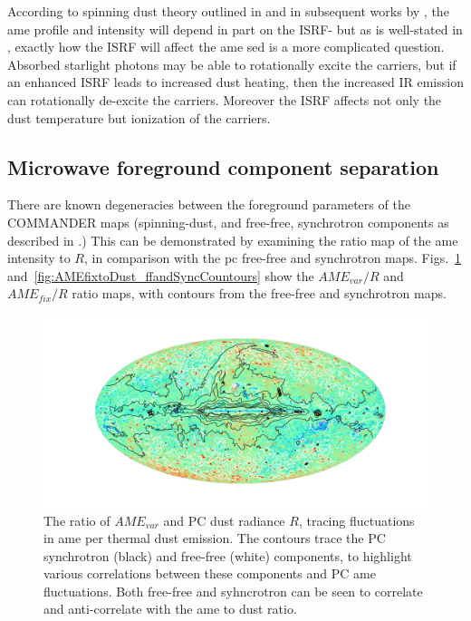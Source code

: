             According to spinning dust theory outlined in \cite{draine98a} and in subsequent works by \cite{ysard10a}, the \acrshort{ame} profile and intensity will depend in part on the ISRF- but as is well-stated in \cite{hensley17a}, exactly how the ISRF will affect the \acrshort{ame} \acrshort{sed} is a more complicated question. Absorbed starlight photons may be able to rotationally excite the carriers, but if an enhanced ISRF leads to increased dust heating, then the increased IR emission can rotationally de-excite the carriers. Moreover the ISRF affects not only the dust temperature but ionization of the carriers.

          \subsection{Microwave foreground component separation}
            There are known degeneracies between the foreground parameters of the COMMANDER maps (spinning-dust, and free-free, synchrotron components as described in \cite{planck15X}.) This can be demonstrated by examining the ratio map of the \acrshort{ame} intensity to $R$, in comparison with the \acrshort{pc} free-free and synchrotron maps. Figs.~\ref{fig:AMEvartoDust_ffandSyncCountours} and~\ref{fig:AMEfixtoDust_ffandSyncCountours} show the $AME_{var}/R$ and $AME_{fix}/R$ ratio maps, with contours from the free-free and synchrotron maps.
                \begin{figure}
                    \includegraphics[width=\textwidth,trim={6cm 2cm 5.0cm 2cm},clip]{../Plots/ch_allsky/AMEvartoDust_ffandSyncCountours.pdf}
                    \centering
                    \caption{The ratio of $AME_{var}$ and PC dust radiance $R$, tracing fluctuations in \acrshort{ame} per thermal dust emission. The contours trace the PC synchrotron (black) and free-free (white) components, to highlight various correlations between these components and PC \acrshort{ame} fluctuations. Both free-free and syhncrotron can be seen to correlate and anti-correlate with the \acrshort{ame} to dust ratio.}
                    \label{fig:AMEvartoDust_ffandSyncCountours}
                \end{figure}
